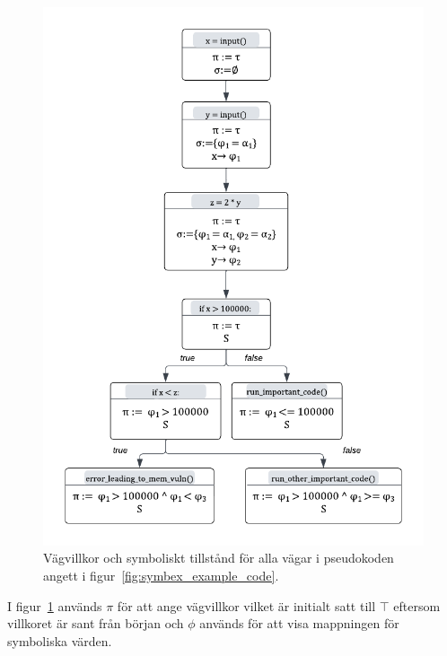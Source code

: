 \begin{figure}
    \centering
    \includegraphics[scale=0.5]{figures/final_symbolic_example_graph.png}
    \caption{Vägvillkor och symboliskt tillstånd för alla vägar i
        pseudokoden angett i figur~\ref{fig:symbex_example_code}.}
    \label{fig:symbex_example_graph}
\end{figure}

I figur~\ref{fig:symbex_example_graph} används $\pi$ för att ange vägvillkor vilket
är initialt satt till $\top$ eftersom villkoret är sant från början och $\phi$
används för att visa mappningen för symboliska värden.

